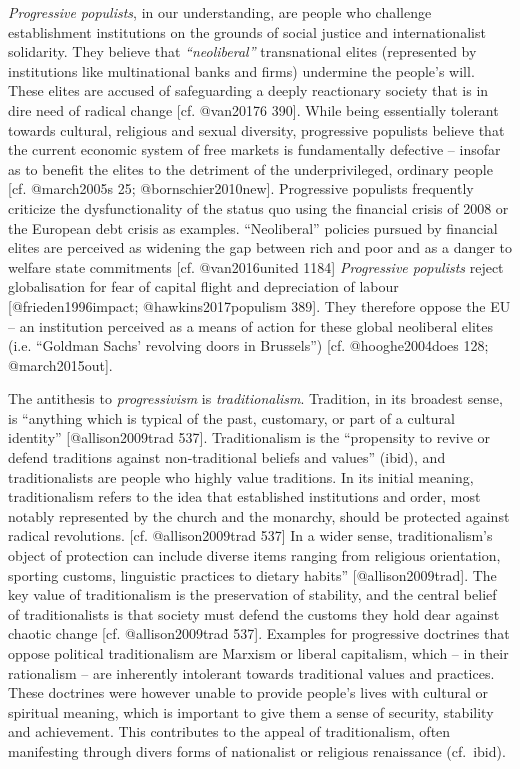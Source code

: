 \documentclass[]{article}
\begin{document}
\emph{Progressive populists}, in our understanding, are people who
challenge establishment institutions on the grounds of social justice
and internationalist solidarity. They believe that \emph{``neoliberal''}
transnational elites (represented by institutions like multinational
banks and firms) undermine the people's will. These elites are accused
of safeguarding a deeply reactionary society that is in dire need of
radical change {[}cf. @van20176 390{]}. While being essentially tolerant
towards cultural, religious and sexual diversity, progressive populists
believe that the current economic system of free markets is
fundamentally defective -- insofar as to benefit the elites to the
detriment of the underprivileged, ordinary people {[}cf. @march2005s 25;
@bornschier2010new{]}. Progressive populists frequently criticize the
dysfunctionality of the status quo using the financial crisis of 2008 or
the European debt crisis as examples. ``Neoliberal'' policies pursued by
financial elites are perceived as widening the gap between rich and poor
and as a danger to welfare state commitments {[}cf. @van2016united
1184{]} \emph{Progressive populists} reject globalisation for fear of
capital flight and depreciation of labour {[}@frieden1996impact;
@hawkins2017populism 389{]}. They therefore oppose the EU -- an
institution perceived as a means of action for these global neoliberal
elites (i.e. ``Goldman Sachs' revolving doors in Brussels'') {[}cf.
@hooghe2004does 128; @march2015out{]}.

The antithesis to \emph{progressivism} is \emph{traditionalism}.
Tradition, in its broadest sense, is ``anything which is typical of the
past, customary, or part of a cultural identity'' {[}@allison2009trad
537{]}. Traditionalism is the ``propensity to revive or defend
traditions against non‐traditional beliefs and values'' (ibid), and
traditionalists are people who highly value traditions. In its initial
meaning, traditionalism refers to the idea that established institutions
and order, most notably represented by the church and the monarchy,
should be protected against radical revolutions. {[}cf. @allison2009trad
537{]} In a wider sense, traditionalism's object of protection can
include diverse items ranging from religious orientation, sporting
customs, linguistic practices to dietary habits''
{[}@allison2009trad{]}. The key value of traditionalism is the
preservation of stability, and the central belief of traditionalists is
that society must defend the customs they hold dear against chaotic
change {[}cf. @allison2009trad 537{]}. Examples for progressive
doctrines that oppose political traditionalism are Marxism or liberal
capitalism, which -- in their rationalism -- are inherently intolerant
towards traditional values and practices. These doctrines were however
unable to provide people's lives with cultural or spiritual meaning,
which is important to give them a sense of security, stability and
achievement. This contributes to the appeal of traditionalism, often
manifesting through divers forms of nationalist or religious renaissance
(cf.~ibid).
\end{document}
